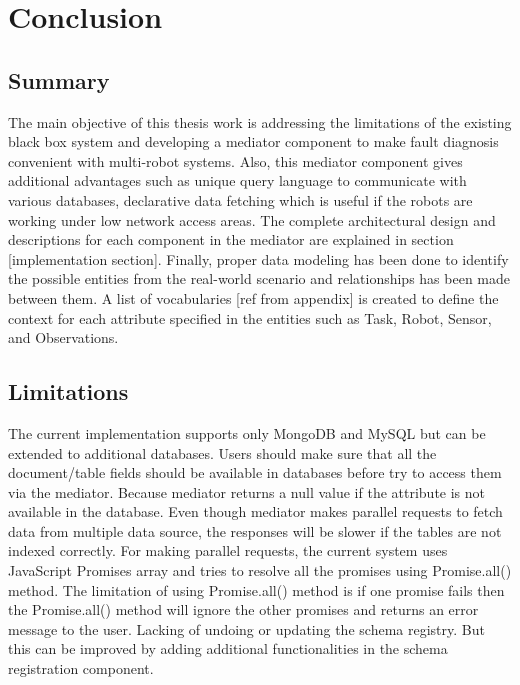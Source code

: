 

	\let\cleardoublepage\clearpage
\chapter{Conclusion} \label{sec:conclusion}

\section{Summary}

The main objective of this thesis work is addressing the limitations of the existing black box system and developing a mediator component to make fault diagnosis convenient with multi-robot systems. Also, this mediator component gives additional advantages such as unique query language to communicate with various databases, declarative data fetching which is useful if the robots are working under low network access areas. The complete architectural design and descriptions for each component in the mediator are explained in section [implementation section]. Finally, proper data modeling has been done to identify the possible entities from the real-world scenario and relationships has been made between them. A list of vocabularies [ref from appendix] is created to define the context for each attribute specified in the entities such as Task, Robot, Sensor, and Observations.

\section{Limitations}

The current implementation supports only MongoDB and MySQL but can be extended to additional databases. Users should make sure that all the document/table fields should be available in databases before try to access them via the mediator. Because mediator returns a null value if the attribute is not available in the database. Even though mediator makes parallel requests to fetch data from multiple data source, the responses will be slower if the tables are not indexed correctly. For making parallel requests, the current system uses JavaScript Promises array and tries to resolve all the promises using Promise.all() method. The limitation of using Promise.all() method is if one promise fails then the Promise.all() method will ignore the other promises and returns an error message to the user. Lacking of undoing or updating the schema registry. But this can be improved by adding additional functionalities in the schema registration component.

